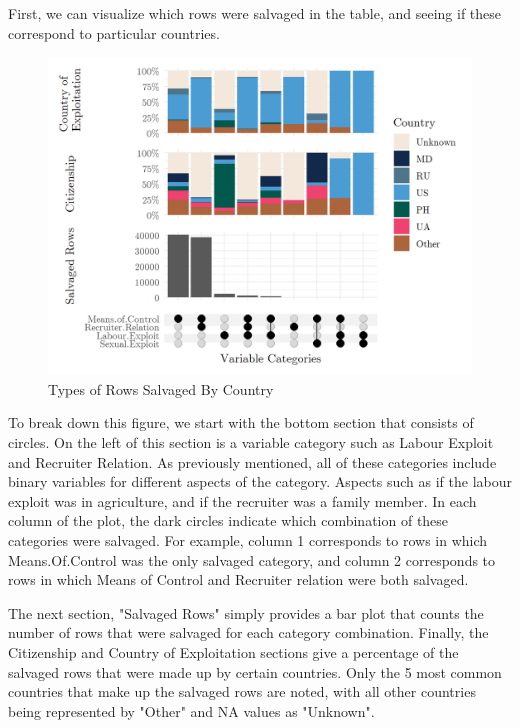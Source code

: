 \documentclass{article} %
\begin{document}
First, we can visualize which rows were salvaged in the table, and seeing if these correspond to particular countries.

\FloatBarrier
\begin{figure}[H]
	\caption{Types of Rows Salvaged By Country}
	\includegraphics[width = \textwidth]{SalvageRowsUpset}
\end{figure}
\FloatBarrier

To break down this figure, we start with the bottom section that consists of circles. On the left of this section is a variable category such as Labour Exploit and Recruiter Relation. As previously mentioned, all of these categories include binary variables for different aspects of the category. Aspects such as if the labour exploit was in agriculture, and if the recruiter was a family member. In each column of the plot, the dark circles indicate which combination of these categories were salvaged. For example, column 1 corresponds to rows in which Means.Of.Control was the only salvaged category, and column 2 corresponds to rows in which Means of Control and Recruiter relation were both salvaged.

The next section, "Salvaged Rows" simply provides a bar plot that counts the number of rows that were salvaged for each category combination. Finally, the Citizenship and Country of Exploitation sections give a percentage of the salvaged rows that were made up by certain countries. Only the 5 most common countries that make up the salvaged rows are noted, with all other countries being represented by "Other" and NA values as "Unknown".
\end{document}
